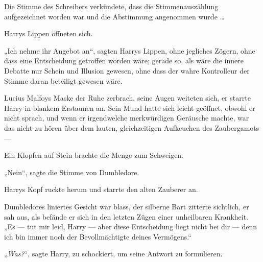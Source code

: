 Die Stimme des Schreibers verkündete, dass die Stimmenauszählung aufgezeichnet worden war und die Abstimmung angenommen wurde …

Harrys Lippen öffneten sich.

„Ich nehme ihr Angebot an“, sagten Harrys Lippen, ohne jegliches Zögern, ohne dass eine Entscheidung getroffen worden wäre; gerade so, als wäre die innere Debatte nur Schein und Illusion gewesen, ohne dass der wahre Kontrolleur der Stimme daran beteiligt gewesen wäre.

Lucius Malfoys Maske der Ruhe zerbrach, seine Augen weiteten sich, er starrte Harry in blankem Erstaunen an. Sein Mund hatte sich leicht geöffnet, obwohl er nicht sprach, und wenn er irgendwelche merkwürdigen Geräusche machte, war das nicht zu hören über dem lauten, gleichzeitigen Aufkeuchen des Zaubergamots —

Ein Klopfen auf Stein brachte die Menge zum Schweigen.

„Nein“, sagte die Stimme von Dumbledore.

Harrys Kopf ruckte herum und starrte den alten Zauberer an.

Dumbledores liniertes Gesicht war blass, der silberne Bart zitterte sichtlich, er sah aus, als befände er sich in den letzten Zügen einer unheilbaren Krankheit.
„Es — tut mir leid, Harry — aber diese Entscheidung liegt nicht bei dir — denn ich bin immer noch der Bevollmächtigte deines Vermögens.“

„\emph{Was?}“, sagte Harry, zu schockiert, um seine Antwort zu formulieren.

